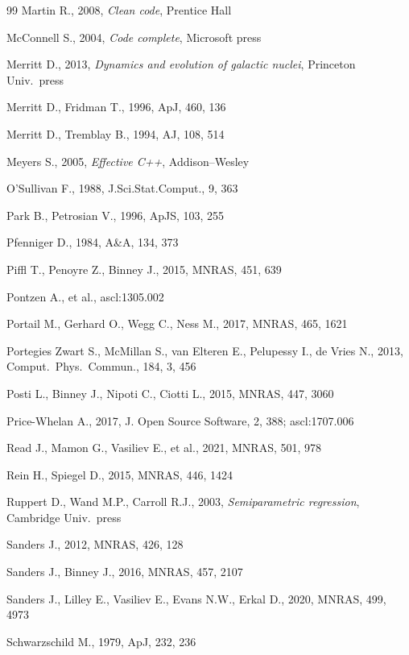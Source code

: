 \documentclass[12pt]{article}
\begin{document}
\begin{thebibliography}{99}
Martin R., 2008, \textsl{Clean code}, Prentice Hall

McConnell S., 2004, \textsl{Code complete}, Microsoft press

Merritt D., 2013, \textsl{Dynamics and evolution of galactic nuclei}, Princeton Univ.\ press

Merritt D., Fridman T., 1996, ApJ, 460, 136

Merritt D., Tremblay B., 1994, AJ, 108, 514

Meyers S., 2005, \textsl{Effective C++}, Addison--Wesley

O'Sullivan F., 1988, J.Sci.Stat.Comput., 9, 363

Park B., Petrosian V., 1996, ApJS, 103, 255

Pfenniger D., 1984, A\&A, 134, 373

Piffl T., Penoyre Z., Binney J., 2015, MNRAS, 451, 639

Pontzen A., et al., ascl:1305.002

Portail M., Gerhard O., Wegg C., Ness M., 2017, MNRAS, 465, 1621

Portegies Zwart S., McMillan S., van Elteren E., Pelupessy I., de Vries N., 2013, Comput.\ Phys.\ Commun., 184, 3, 456

Posti L., Binney J., Nipoti C., Ciotti L., 2015, MNRAS, 447, 3060

Price-Whelan A., 2017, J. Open Source Software, 2, 388; ascl:1707.006

Read J., Mamon G., Vasiliev E., et al., 2021, MNRAS, 501, 978

Rein H., Spiegel D., 2015, MNRAS, 446, 1424

Ruppert D., Wand M.P., Carroll R.J., 2003, \textsl{Semiparametric regression}, Cambridge Univ.\ press

Sanders J., 2012, MNRAS, 426, 128

Sanders J., Binney J., 2016, MNRAS, 457, 2107

Sanders J., Lilley E., Vasiliev E., Evans N.W., Erkal D., 2020, MNRAS, 499, 4973

Schwarzschild M., 1979, ApJ, 232, 236


\end{thebibliography}
\end{document}
